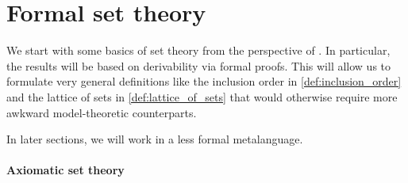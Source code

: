 \section{Formal set theory}\label{sec:formal_set_theory}

We start with some basics of set theory from the perspective of . In particular, the results will be based on derivability via formal proofs. This will allow us to formulate very general definitions like the inclusion order in \cref{def:inclusion_order} and the lattice of sets in \cref{def:lattice_of_sets} that would otherwise require more awkward model-theoretic counterparts.

In later sections, we will work in a less formal metalanguage.

\paragraph{Axiomatic set theory}

